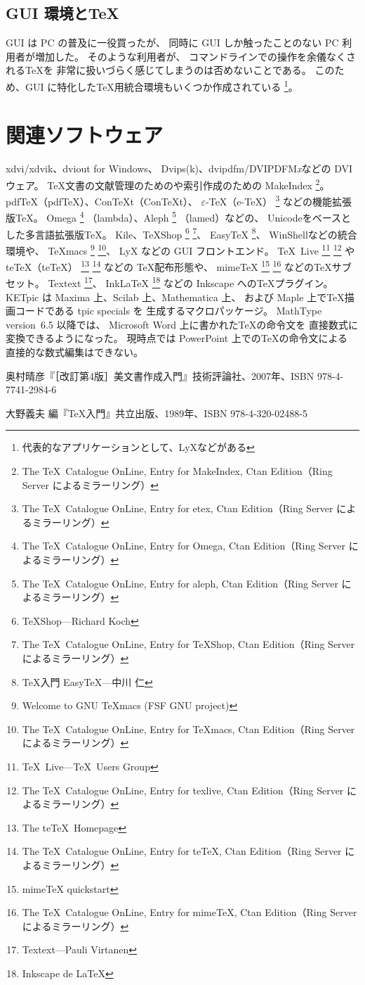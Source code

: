 \documentclass{jsarticle}
\def\DVIPDFMx{DVIPDFM{\itshape x}}
\begin{document}
\subsection{GUI 環境と\TeX}

GUI は PC の普及に一役買ったが、
同時に GUI しか触ったことのない PC 利用者が増加した。
そのような利用者が、
コマンドラインでの操作を余儀なくされる\TeX を
非常に扱いづらく感じてしまうのは否めないことである。
このため、GUI に特化した\TeX 用統合環境もいくつか作成されている%
\footnote{代表的なアプリケーションとして、LyXなどがある}。

\section{関連ソフトウェア}

xdvi/xdvik、dviout for Windows、
Dvips(k)、dvipdfm/\DVIPDFMx などの DVI ウェア。
\TeX 文書の文献管理のための\BibTeX や索引作成のための MakeIndex%
\footnote{The \TeX\ Catalogue OnLine, Entry for MakeIndex, 
Ctan Edition（Ring Server によるミラーリング）}。
pdf\TeX（pdfTeX）、Con{\TeX}t（ConTeXt）、
$\varepsilon$-\TeX（e-TeX）%
\footnote{The \TeX\ Catalogue OnLine, Entry for etex, 
Ctan Edition（Ring Server によるミラーリング）}%
などの機能拡張版\TeX。
Omega%
\footnote{The \TeX\ Catalogue OnLine, Entry for Omega, 
Ctan Edition（Ring Server によるミラーリング）}%
（lambda）、Aleph%
\footnote{The \TeX\ Catalogue OnLine, Entry for aleph, Ctan Edition（Ring Server によるミラーリング）}%
（lamed）などの、
Unicodeをベースとした多言語拡張版\TeX。
Kile、TeXShop%
\footnote{TeXShop---Richard Koch}
\footnote{The \TeX\ Catalogue OnLine, Entry for TeXShop, 
Ctan Edition（Ring Server によるミラーリング）}、
EasyTeX%
\footnote{\TeX 入門 EasyTeX---中川 仁}、
WinShellなどの統合環境や、
TeXmacs%
\footnote{Welcome to GNU TeXmacs (FSF GNU project)}%
\footnote{The \TeX\ Catalogue OnLine, Entry for TeXmacs, 
Ctan Edition（Ring Server によるミラーリング）}、
LyX などの GUI フロントエンド。
\TeX\ Live%
\footnote{\TeX\ Live---\TeX\ Users Group}%
\footnote{The \TeX\ Catalogue OnLine, Entry for texlive, 
Ctan Edition（Ring Server によるミラーリング）}%
や te\TeX（teTeX）%
\footnote{The te\TeX\ Homepage}%
\footnote{The \TeX\ Catalogue OnLine, Entry for te\TeX, 
Ctan Edition（Ring Server によるミラーリング）}%
などの \TeX 配布形態や、
mimeTeX%
\footnote{mimeTeX quickstart}%
\footnote{The \TeX\ Catalogue OnLine, Entry for mimeTeX, 
Ctan Edition（Ring Server によるミラーリング）}%
などの\TeX サブセット。
Textext%
\footnote{Textext---Pauli Virtanen}、
InkLaTeX%
\footnote{Inkscape de \LaTeX}%
などの Inkscape への\TeX プラグイン。
KETpic は Maxima 上、Scilab 上、Mathematica 上、
および Maple 上で\TeX 描画コードである tpic specials を
生成するマクロパッケージ。
MathType version~6.5 以降では、
Microsoft Word 上に書かれた\TeX の命令文を
直接数式に変換できるようになった。
現時点では PowerPoint 上での\TeX の命令文による
直接的な数式編集はできない。

\begin{thebibliography}{9}
奥村晴彦『［改訂第4版］\LaTeXe 美文書作成入門』技術評論社、2007年、ISBN 978-4-7741-2984-6

大野義夫 編『\TeX 入門』共立出版、1989年、ISBN 978-4-320-02488-5
\end{thebibliography}
\end{document}
